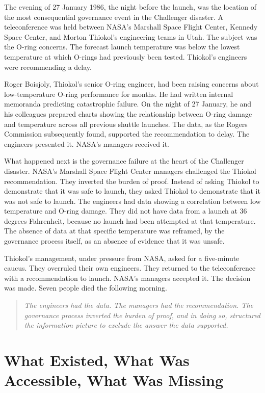 The evening of 27 January 1986, the night before the launch, was the location of the most consequential governance event in the Challenger disaster. A teleconference was held between NASA's Marshall Space Flight Center, Kennedy Space Center, and Morton Thiokol's engineering teams in Utah. The subject was the O-ring concerns. The forecast launch temperature was below the lowest temperature at which O-rings had previously been tested. Thiokol's engineers were recommending a delay.

Roger Boisjoly, Thiokol's senior O-ring engineer, had been raising concerns about low-temperature O-ring performance for months. He had written internal memoranda predicting catastrophic failure. On the night of 27 January, he and his colleagues prepared charts showing the relationship between O-ring damage and temperature across all previous shuttle launches. The data, as the Rogers Commission subsequently found, supported the recommendation to delay. The engineers presented it. NASA's managers received it.

What happened next is the governance failure at the heart of the Challenger disaster. NASA's Marshall Space Flight Center managers challenged the Thiokol recommendation. They inverted the burden of proof. Instead of asking Thiokol to demonstrate that it was safe to launch, they asked Thiokol to demonstrate that it was not safe to launch. The engineers had data showing a correlation between low temperature and O-ring damage. They did not have data from a launch at 36 degrees Fahrenheit, because no launch had been attempted at that temperature. The absence of data at that specific temperature was reframed, by the governance process itself, as an absence of evidence that it was unsafe.

Thiokol's management, under pressure from NASA, asked for a five-minute caucus. They overruled their own engineers. They returned to the teleconference with a recommendation to launch. NASA's managers accepted it. The decision was made. Seven people died the following morning.

\begin{quote}
\emph{The engineers had the data. The managers had the recommendation. The governance process inverted the burden of proof, and in doing so, structured the information picture to exclude the answer the data supported.}
\end{quote}

\scenebreak

\section{What Existed, What Was Accessible, What Was Missing}

